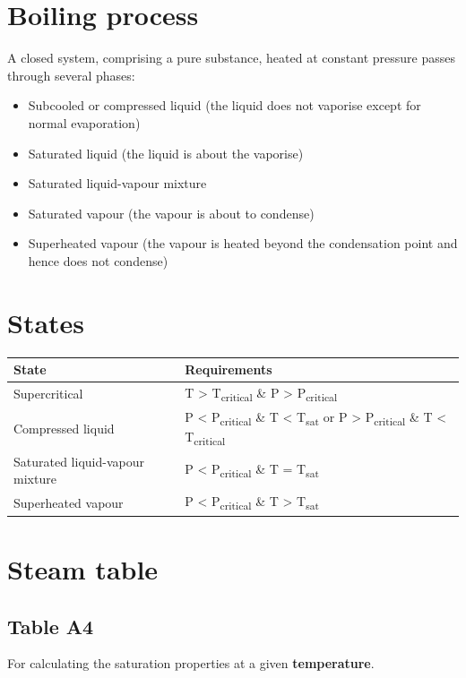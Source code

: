 \documentclass[11pt]{article}
\begin{document}
\section{Boiling process}
\label{sec:org90e3c80}
A closed system, comprising a pure substance, heated at constant pressure passes through several phases:
\begin{itemize}
\item Subcooled or compressed liquid (the liquid does not vaporise except for normal evaporation)
\item Saturated liquid (the liquid is about the vaporise)
\item Saturated liquid-vapour mixture
\item Saturated vapour (the vapour is about to condense)
\item Superheated vapour (the vapour is heated beyond the condensation point and hence does not condense)
\end{itemize}


\section{States}
\label{sec:org76bfa23}
\begin{center}
\begin{tabular}{l|l}
State & Requirements\\[0pt]
\hline
Supercritical & T > T\textsubscript{critical} \& P > P\textsubscript{critical}\\[0pt]
Compressed liquid & P < P\textsubscript{critical} \& T < T\textsubscript{sat} or P > P\textsubscript{critical} \& T < T\textsubscript{critical}\\[0pt]
Saturated liquid-vapour mixture & P < P\textsubscript{critical} \& T = T\textsubscript{sat}\\[0pt]
Superheated vapour & P < P\textsubscript{critical} \& T > T\textsubscript{sat}\\[0pt]
\end{tabular}
\end{center}

\newpage

\section{Steam table}
\label{sec:org4ffd977}

\subsection{Table A4}
\label{sec:org5bbd97c}
For calculating the saturation properties at a given \textbf{temperature}.
\end{document}
